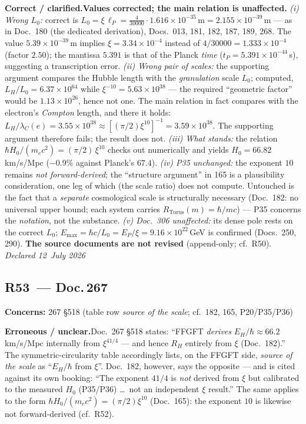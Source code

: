 \smallskip\noindent\textbf{Correct / clarified.}\quad \textbf{Values corrected; the main relation is unaffected.} \emph{(i) Wrong $L_0$:} correct is $L_0 = \xi\,\ell_P = \tfrac{4}{30000}\cdot 1.616\times10^{-35}\,\text{m} = \boxed{2.155\times10^{-39}\,\text{m}}$ --- as in Doc.~180 (the dedicated derivation), Docs.~013, 181, 182, 187, 189, 268. The value $5.39\times10^{-39}$\,m implies $\xi = 3.34\times10^{-4}$ instead of $4/30000 = 1.333\times10^{-4}$ (factor $2.50$); the mantissa $5.391$ is that of the Planck \emph{time} ($t_P = 5.391\times10^{-44}$\,s), suggesting a transcription error. \emph{(ii) Wrong pair of scales:} the supporting argument compares the Hubble length with the \emph{granulation} scale $L_0$; computed, $L_H/L_0 = 6.37\times10^{64}$ while $\xi^{-10} = 5.63\times10^{38}$ --- the required \enquote{geometric factor} would be $1.13\times10^{26}$, hence not one. The main relation in fact compares with the electron's \emph{Compton} length, and there it holds: $L_H/\lambda_C(e) = 3.55\times10^{38} \approx [(\pi/2)\xi^{10}]^{-1} = 3.59\times10^{38}$. The supporting argument therefore fails; the result does not. \emph{(iii) What stands:} the relation $\hbar H_0/(m_e c^2) = (\pi/2)\,\xi^{10}$ checks out numerically and yields $H_0 = 66.82$\,km/s/Mpc ($-0.9\%$ against Planck's $67.4$). \emph{(iv) P35 unchanged:} the exponent $10$ remains \emph{not forward-derived}; the \enquote{structure argument} in 165 is a plausibility consideration, one leg of which (the scale ratio) does not compute. Untouched is the fact that a \emph{separate} cosmological scale is structurally necessary (Doc.~182: no universal upper bound; each system carries $R_\text{Torus}(m)=\hbar/mc$) --- P35 concerns the \emph{notation}, not the substance. \emph{(v) Doc.~306 unaffected:} its dense pole rests on the correct $L_0$; $E_\text{max} = \hbar c/L_0 = E_P/\xi = 9.16\times10^{22}$\,GeV is confirmed (Docs.~250, 290). \textbf{The source documents are not revised} (append-only; cf.\ R50). \emph{Declared 12~July 2026}


\medskip


\subsection*{R53~--- Doc.\,267}

\noindent\textbf{Concerns:} 267 \S518 (table row \emph{source of the scale}; cf.\ 182, 165, P20/P35/P36)


\smallskip\noindent\textbf{Erroneous / unclear.}\quad Doc.~267 \S518 states: \enquote{FFGFT \emph{derives} $E_H/\hbar \approx 66.2$\,km/s/Mpc internally from $\xi^{41/4}$ --- and hence $R_H$ entirely from $\xi$ (Doc.~182).} The symmetric-circularity table accordingly lists, on the FFGFT side, \emph{source of the scale} as \enquote{$E_H/\hbar$ from $\xi$}. Doc.~182, however, says the opposite --- and is cited against its own booking: \enquote{The exponent $41/4$ is \emph{not} derived from $\xi$ but calibrated to the measured $H_0$ (P35/P36) \ldots\ not an independent $\xi$ result.} The same applies to the form $\hbar H_0/(m_e c^2) = (\pi/2)\xi^{10}$ (Doc.~165): the exponent $10$ is likewise not forward-derived (cf.\ R52).


